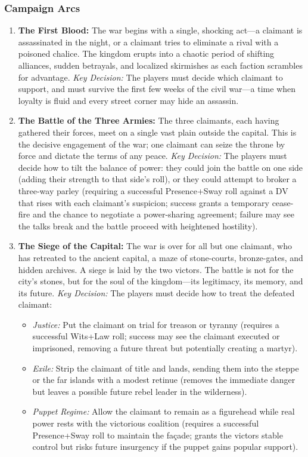 \documentclass[11pt]{article}
\begin{document}
\subsubsection{Campaign Arcs}
\begin{enumerate}
    \item \textbf{The First Blood:} The war begins with a single, shocking act—a claimant is assassinated in the night, or a claimant tries to eliminate a rival with a poisoned chalice. The kingdom erupts into a chaotic period of shifting alliances, sudden betrayals, and localized skirmishes as each faction scrambles for advantage. \textit{Key Decision:} The players must decide which claimant to support, and must survive the first few weeks of the civil war—a time when loyalty is fluid and every street corner may hide an assassin.
    \item \textbf{The Battle of the Three Armies:} The three claimants, each having gathered their forces, meet on a single vast plain outside the capital. This is the decisive engagement of the war; one claimant can seize the throne by force and dictate the terms of any peace. \textit{Key Decision:} The players must decide how to tilt the balance of power: they could join the battle on one side (adding their strength to that side's roll), or they could attempt to broker a three-way parley (requiring a successful Presence+Sway roll against a DV that rises with each claimant's suspicion; success grants a temporary cease-fire and the chance to negotiate a power-sharing agreement; failure may see the talks break and the battle proceed with heightened hostility).
    \item \textbf{The Siege of the Capital:} The war is over for all but one claimant, who has retreated to the ancient capital, a maze of stone-courts, bronze-gates, and hidden archives. A siege is laid by the two victors. The battle is not for the city's stones, but for the soul of the kingdom—its legitimacy, its memory, and its future. \textit{Key Decision:} The players must decide how to treat the defeated claimant:
    \begin{itemize}
        \item \textit{Justice:} Put the claimant on trial for treason or tyranny (requires a successful Wits+Law roll; success may see the claimant executed or imprisoned, removing a future threat but potentially creating a martyr).
        \item \textit{Exile:} Strip the claimant of title and lands, sending them into the steppe or the far islands with a modest retinue (removes the immediate danger but leaves a possible future rebel leader in the wilderness).
        \item \textit{Puppet Regime:} Allow the claimant to remain as a figurehead while real power rests with the victorious coalition (requires a successful Presence+Sway roll to maintain the façade; grants the victors stable control but risks future insurgency if the puppet gains popular support).
    \end{itemize}
\end{enumerate}
\end{document}
